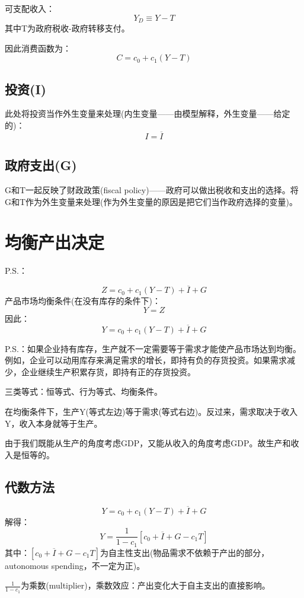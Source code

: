 \documentclass{article}
\begin{document}
\hspace*{\fill}

可支配收入：
\[
Y_D\equiv Y-T
\]
其中T为政府税收-政府转移支付。

因此消费函数为：
\[
C=c_0+c_1(Y-T)
\]

\subsection{投资(I)}
此处将投资当作外生变量来处理(内生变量——由模型解释，外生变量——给定的)：
\[
I=\overline{I}
\]

\subsection{政府支出(G)}
G和T一起反映了财政政策(fiscal policy)——政府可以做出税收和支出的选择。将G和T作为外生变量来处理(作为外生变量的原因是把它们当作政府选择的变量)。

\section{均衡产出决定}

P.S.：

\[
Z=c_0+c_1(Y-T)+\overline{I}+G
\]
产品市场均衡条件(在没有库存的条件下)：
\[
Y=Z
\]
因此：
\[
Y=c_0+c_1(Y-T)+\overline{I}+G
\]

\hspace*{\fill}

P.S.：如果企业持有库存，生产就不一定需要等于需求才能使产品市场达到均衡。例如，企业可以动用库存来满足需求的增长，即持有负的存货投资。如果需求减少，企业继续生产积累存货，即持有正的存货投资。

三类等式：恒等式、行为等式、均衡条件。

在均衡条件下，生产Y(等式左边)等于需求(等式右边)。反过来，需求取决于收入Y，收入本身就等于生产。

由于我们既能从生产的角度考虑GDP，又能从收入的角度考虑GDP。故生产和收入是恒等的。


\subsection{代数方法}
\[
Y=c_0+c_1(Y-T)+\overline{I}+G
\]
解得：
\[
Y=\frac{1}{1-c_1}[c_0+\overline{I}+G-c_1T]
\]
其中：$ [c_0+\overline{I}+G-c_1T] $为自主性支出(物品需求不依赖于产出的部分，autonomous spending，不一定为正)。

$ \frac{1}{1-c_1} $为乘数(multiplier)，乘数效应：产出变化大于自主支出的直接影响。
\end{document}
